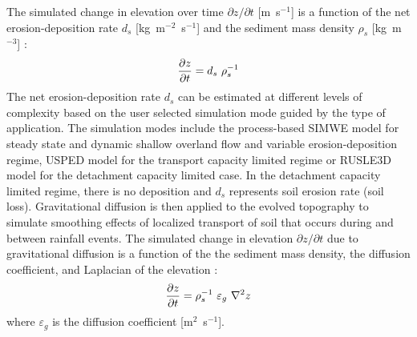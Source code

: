 \documentclass[gmd, manuscript]{copernicus}
\begin{document}
The simulated change in elevation over time 
${\partial z / \partial t}$ [\unit{m~s}$^{-1}$] is a function of
the net erosion-deposition rate $d_s$ [\unit{kg~m}$^{-2}$~\unit{s}$^{-1}$] 
and the sediment mass density $\rho_s$ [\unit{kg~m}$^{-3}$] 
\citep{Mitasova2013}:
\begin{equation}
\label{eq:evolution} 
{\partial z \over \partial t } = d_s ~ \rho_s^{-1} 
\end{equation}
The net erosion-deposition rate $d_s$ can be estimated at different levels of complexity based on the 
user selected simulation mode guided by the type of application.
The simulation modes include the process-based SIMWE model for
steady state and dynamic shallow overland flow and variable erosion-deposition regime,
USPED model for the transport capacity limited regime or RUSLE3D model for the detachment capacity limited case. 
In the detachment capacity limited regime, there is no deposition and $d_s$ represents soil erosion rate (soil loss).
%
Gravitational diffusion is then applied to the evolved topography
to simulate smoothing effects of localized transport of soil that
occurs during and between rainfall events.
The simulated change in elevation $\partial z / \partial t$ 
due to gravitational diffusion
is a function of the the sediment mass density,
the diffusion coefficient, and Laplacian of the elevation
\citep{thaxton2004}:
\begin{equation}
\label{eq:grav_diffusion} 
{\partial z \over \partial t }= \rho_s^{-1} ~ \varepsilon_g ~ \nabla^2 z 
\end{equation}
\noindent
where $\varepsilon_g$ is the diffusion coefficient [\unit{m}$^{2}$~\unit{s}$^{-1}$].

\end{document}
